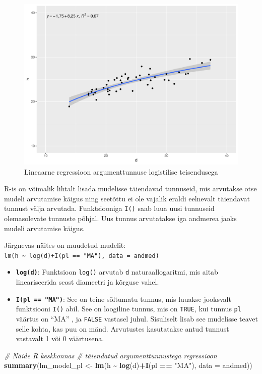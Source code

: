 \documentclass[
]{book}
\newenvironment{Shaded}{\begin{snugshade}}{\end{snugshade}}
\newcommand{\AttributeTok}[1]{\textcolor[rgb]{0.13,0.29,0.53}{#1}}
\newcommand{\CommentTok}[1]{\textcolor[rgb]{0.56,0.35,0.01}{\textit{#1}}}
\newcommand{\FunctionTok}[1]{\textcolor[rgb]{0.13,0.29,0.53}{\textbf{#1}}}
\newcommand{\NormalTok}[1]{#1}
\newcommand{\OtherTok}[1]{\textcolor[rgb]{0.56,0.35,0.01}{#1}}
\newcommand{\SpecialCharTok}[1]{\textcolor[rgb]{0.81,0.36,0.00}{\textbf{#1}}}
\newcommand{\StringTok}[1]{\textcolor[rgb]{0.31,0.60,0.02}{#1}}
\providecommand{\tightlist}{%
  \setlength{\itemsep}{0pt}\setlength{\parskip}{0pt}}
\renewenvironment{Shaded} {\begin{snugshade}\footnotesize} {\end{snugshade}}
\begin{document}
\begin{figure}
\includegraphics[width=0.8\linewidth]{_main_files/figure-latex/unnamed-chunk-61-1} \caption{Lineaarne regressioon argumenttunnuse logistilise teisendusega}\label{fig:unnamed-chunk-61}
\end{figure}

R-is on võimalik lihtalt lisada mudelisse täiendavad tunnuseid, mis arvutakse otse mudeli arvutamise käigus ning seetõttu ei ole vajalik eraldi eelnevalt täiendavat tunnust välja arvutada. Funktsiooniga \texttt{I()} saab luua uusi tunnuseid olemasolevate tunnuste põhjal. Uus tunnus arvutatakse iga andmerea jaoks mudeli arvutamise käigus.

Järgnevas näites on muudetud mudelit: \texttt{lm(h\ \textasciitilde{}\ log(d)+I(pl\ ==\ "MA"),\ data\ =\ andmed)}

\begin{itemize}
\tightlist
\item
  \textbf{\texttt{log(d)}}: Funktsioon \texttt{log()} arvutab \texttt{d} naturaallogaritmi, mis aitab lineariseerida seost diameetri ja kõrguse vahel.
\item
  \textbf{\texttt{I(pl\ ==\ "MA")}}: See on teine sõltumatu tunnus, mis luuakse jooksvalt funktsiooni \texttt{I()} abil. See on loogiline tunnus, mis on \texttt{TRUE}, kui tunnus \texttt{pl} väärtus on ``MA'' , ja \texttt{FALSE} vastasel juhul. Sisuliselt lisab see mudelisse teavet selle kohta, kas puu on mänd. Arvutustes kasutatakse antud tunnust vastavalt 1 või 0 väärtusena.
\end{itemize}

\begin{Shaded}
\begin{Highlighting}[]
\CommentTok{\# Näide R keskkonnas}
\CommentTok{\# täiendatud argumenttunnustega regressioon}
\FunctionTok{summary}\NormalTok{(lm\_model\_pl }\OtherTok{\textless{}{-}} \FunctionTok{lm}\NormalTok{(h }\SpecialCharTok{\textasciitilde{}} \FunctionTok{log}\NormalTok{(d)}\SpecialCharTok{+}\FunctionTok{I}\NormalTok{(pl }\SpecialCharTok{==} \StringTok{"MA"}\NormalTok{), }\AttributeTok{data =}\NormalTok{ andmed))}
\end{Highlighting}
\end{Shaded}
\end{document}
